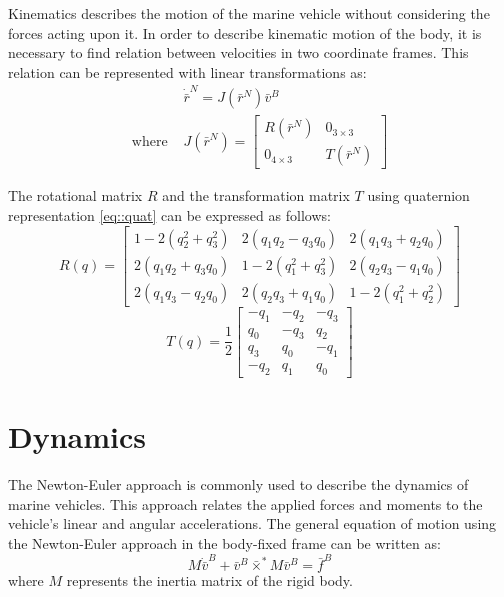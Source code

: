     Kinematics describes the motion of the marine vehicle without considering the forces acting upon it.
    In order to describe kinematic motion of the body, it is necessary to find relation between velocities in two coordinate frames.
    This relation can be represented with linear transformations as:
    \begin{equation}
    \begin{aligned}
        & \dot{\bar{r}}^N=J(\bar{r}^N) \bar{v}^B \\
        \text{where } & J(\bar{r}^N)=\left[\begin{array}{cc}
        R(\bar{r}^N) & 0_{3 \times 3} \\
        0_{4 \times 3} & T(\bar{r}^N)
        \end{array}\right]
    \end{aligned}
    \label{eq::kinematics}
    \end{equation}
    
    The rotational matrix $R$ and the transformation matrix $T$ using quaternion representation \ref{eq::quat} can be expressed as follows:
    \begin{equation}
    R(q)=\left[\begin{array}{ccc}
        1-2\left(q_2^2+q_3^2\right) & 2\left(q_1 q_2-q_3 q_0\right) & 2\left(q_1 q_3+q_2 q_0\right) \\
        2\left(q_1 q_2+q_3 q_0\right) & 1-2\left(q_1^2+q_3^2\right) & 2\left(q_2 q_3-q_1 q_0\right) \\
        2\left(q_1 q_3-q_2 q_0\right) & 2\left(q_2 q_3+q_1 q_0\right) & 1-2\left(q_1^2+q_2^2\right)
        \end{array}\right]
    \end{equation}
    \begin{equation}
    T(q)=\frac{1}{2}\left[\begin{array}{rrr}
        -q_1 & -q_2 & -q_3 \\
        q_0 & -q_3 & q_2 \\
        q_3 & q_0 & -q_1 \\
        -q_2 & q_1 & q_0
        \end{array}\right]
    \end{equation}

\section{Dynamics}

    The Newton-Euler approach is commonly used to describe the dynamics of marine vehicles.
    This approach relates the applied forces and moments to the vehicle's linear and angular accelerations.
    The general equation of motion using the Newton-Euler approach in the body-fixed frame can be written as:
    \begin{equation}
        M\dot{\bar{v}}^B+\bar{v}^B\bar{\times}^*M\bar{v}^B=\bar{f}^B
    \end{equation}
    where $M$ represents the inertia matrix of the rigid body.

